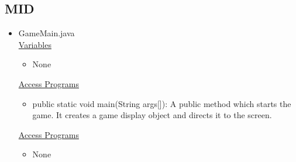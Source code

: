 \documentclass[12pt]{article}
\begin{document}
	\subsection{MID}
	\begin{itemize}
		\item GameMain.java \\
		\underline{Variables}
		\begin{itemize}
			\item None
		\end{itemize}
		\underline{Access Programs}
		\begin{itemize}
			\item public static void main(String args[]): A public method which starts the game. It creates a game display object and directs it to the screen.
		\end{itemize}
		\underline{Access Programs}
		\begin{itemize}
			\item None
		\end{itemize}
		

\end{itemize}
\end{document}

